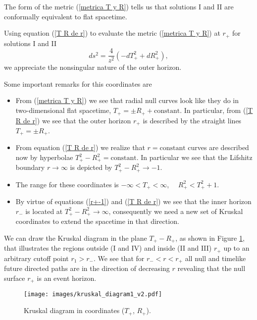 \documentclass[sn-mathphys,Numbered]{sn-jnl}%
\theoremstyle{thmstyleone}%
\theoremstyle{thmstyletwo}%
\theoremstyle{thmstylethree}%
\begin{document}
The form of the metric (\ref{metrica T y R}) tells us that  solutions I and II are conformally equivalent to flat spacetime.

Using equation (\ref{T R de r}) to evaluate the metric (\ref{metrica T y R}) at  $r_+$ for solutions I and II
\begin{equation}
    ds^2= \frac{4}{z^2}\left(-dT_+^2+dR_+^2\right),
\end{equation}
we appreciate the nonsingular nature of the outer horizon.

Some important remarks for this coordinates are
%
\begin{itemize}
    \item From (\ref{metrica T y R}) we see that radial null curves look like they do in two-dimensional flat spacetime, $T_+=\pm R_+ + \text{constant}$. In particular, from (\ref{T R de r}) we see that the outer horizon $r_+$ is described by the straight lines $T_+=\pm R_+$.
    \item   From equation (\ref{T R de r}) we realize that $r=\text{constant}$ curves are described now by hyperbolae $ T_+^2-R_+^2=\text{constant}$. In particular we see that the Lifshitz boundary $r \rightarrow \infty$ is depicted by  $T_+^{2}-R_+^{2}\rightarrow -1$.
    \item The range for these coordinates is $ -\infty<T_+<\infty$, \ \ $R_+^2< T_+^2+1$.
    \item By virtue of equations (\ref{r+-1}) and (\ref{T R de r}) we see that the inner horizon $r_-$ is located at $T_+^2-R_+^2 \rightarrow \infty$, consequently we need a new set of Kruskal coordinates to extend the spacetime in that direction.
\end{itemize}

We can draw the Kruskal diagram in the plane $T_+-R_+$, as shown in Figure \ref{kruskal diagram}, that illustrates the regions outside (I and IV) and inside (II and III) $r_+$ up to an arbitrary cutoff point $r_1>r_-$. We see that for $r_-<r<r_+$ all null and timelike future directed paths are in the direction of decreasing $r$ revealing that the null surface $r_+$ is an event horizon.
%
\begin{figure}
    \centering
    \texttt{[image: images/kruskal\_diagram1\_v2.pdf]}
    \caption{Kruskal diagram in coordinates ($T_+$, $R_+$).}
    \label{kruskal diagram}
\end{figure}
%
\end{document}
